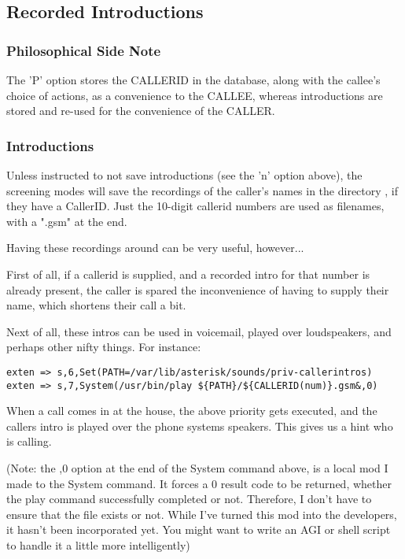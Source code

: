 \subsection{Recorded Introductions}

\subsubsection{Philosophical Side Note}
The 'P' option stores the CALLERID in the database, along with the
callee's choice of actions, as a convenience to the CALLEE, whereas
introductions are stored and re-used for the convenience of the CALLER.

\subsubsection{Introductions}
Unless instructed to not save introductions (see the 'n' option above),
the screening modes will save the recordings of the caller's names in
the directory , if they have
a CallerID.  Just the 10-digit callerid numbers are used as filenames,
with a ".gsm" at the end.

Having these recordings around can be very useful, however...

First of all, if a callerid is supplied, and a recorded intro for that
number is already present, the caller is spared the inconvenience of
having to supply their name, which shortens their call a bit.

Next of all, these intros can be used in voicemail, played over
loudspeakers, and perhaps other nifty things. For instance:

\begin{astlisting}
\begin{verbatim}
exten => s,6,Set(PATH=/var/lib/asterisk/sounds/priv-callerintros)
exten => s,7,System(/usr/bin/play ${PATH}/${CALLERID(num)}.gsm&,0)
\end{verbatim}
\end{astlisting}

When a call comes in at the house, the above priority gets executed,
and the callers intro is played over the phone systems speakers. This
gives us a hint who is calling.

(Note: the ,0 option at the end of the System command above, is a
local mod I made to the System command. It forces a 0 result code to
be returned, whether the play command successfully completed or
not. Therefore, I don't have to ensure that the file exists or
not. While I've turned this mod into the developers, it hasn't been
incorporated yet. You might want to write an AGI or shell script to
handle it a little more intelligently)

